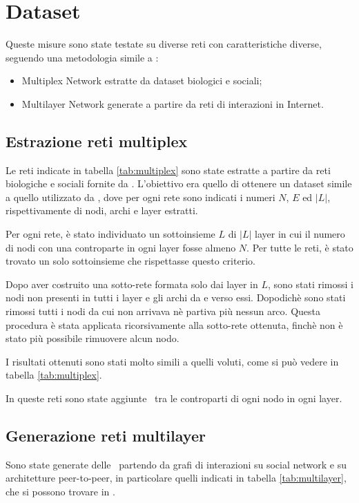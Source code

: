 \chapter{Dataset}
Queste misure sono state testate su diverse reti con caratteristiche diverse, 
seguendo una metodologia simile a \cite{basaras:infspmul}:
\begin{itemize}
    \item Multiplex Network estratte da dataset biologici e sociali;
    \item Multilayer Network generate a partire da reti di interazioni in Internet.
\end{itemize}

\section{Estrazione reti multiplex}
Le reti indicate in tabella \vref{tab:multiplex} sono state estratte a partire da reti biologiche e
sociali fornite da \cite{data:multiplex}.
L'obiettivo era quello di ottenere un dataset simile a quello utilizzato da \cite{basaras:infspmul},
dove per ogni rete sono indicati i numeri $N$, $E$ ed $|L|$, rispettivamente di nodi, archi e layer estratti.

Per ogni rete, è stato individuato un sottoinsieme $L$ di $|L|$ layer in cui il numero di nodi con una 
controparte in ogni layer fosse almeno $N$. Per tutte le reti, è  stato trovato un solo sottoinsieme 
che rispettasse questo criterio.

Dopo aver costruito una sotto-rete formata solo dai layer in $L$, sono stati rimossi i nodi non presenti
in tutti i layer e gli archi da e verso essi. Dopodichè sono stati rimossi tutti i nodi da cui non arrivava
nè partiva più nessun arco. Questa procedura è stata applicata ricorsivamente alla sotto-rete ottenuta, 
finchè non è stato più possibile rimuovere alcun nodo. 

I risultati ottenuti sono stati molto simili a quelli voluti, come si può vedere in tabella \vref{tab:multiplex}.

In queste reti sono state aggiunte \interc\ tra le controparti di ogni nodo in ogni layer.



\section{Generazione reti multilayer}
Sono state generate delle \muln\ partendo da grafi di interazioni su 
social network e su architetture peer-to-peer, in particolare quelli 
indicati in tabella \vref{tab:multilayer}, che si possono trovare in \cite{data:multilayer}.

